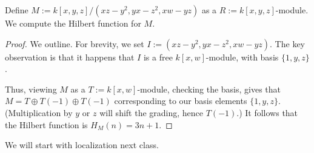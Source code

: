 \begin{exe}[Eisenbud 1.19]
	Define $M:=k[x,y,z]/\left(xz-y^2,yx-z^2,xw-yz\right)$ as a $R:=k[x,y,z]$-module. We compute the Hilbert function for $M$.
\end{exe}
\begin{proof}
	We outline. For brevity, we set $I:=\left(xz-y^2,yx-z^2,xw-yz\right)$. The key observation is that it happens that $I$ is a free $k[x,w]$-module, with basis $\{1,y,z\}$.

	Thus, viewing $M$ as a $T:=k[x,w]$-module, checking the basis, gives that $M=T\oplus T(-1)\oplus T(-1)$ corresponding to our basis elements $\{1,y,z\}$. (Multiplication by $y$ or $z$ will shift the grading, hence $T(-1)$.) It follows that the Hilbert function is $H_M(n)=3n+1$.
\end{proof}
We will start with localization next class.